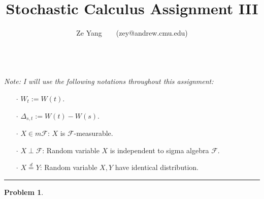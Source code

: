 \documentclass[a4paper, 10pt]{article}
\title{\textbf{Stochastic Calculus Assignment III}}
\author{Ze Yang~~~~(zey@andrew.cmu.edu)}
\theoremstyle{definition}
\newtheorem{problem}{Problem}
\theoremstyle{hSol}
\begin{document}
\maketitle

~\\
\textit{Note:} \textit{I will use the following notations throughout this assignment:}
\begin{itemize}
	\item[$\cdot$] $W_t := W(t)$.
	\item[$\cdot$] $\Delta_{s,t} := W(t) - W(s)$.
	\item[$\cdot$] $X\in m \mathcal{F}$: $X$ is $\mathcal{F}$-measurable.
	\item[$\cdot$] $X\perp \mathcal{F}$: Random variable $X$ is independent to sigma algebra $\mathcal{F}$. 
	\item[$\cdot$] $X\stackrel{d}{=} Y$: Random variable $X,Y$ have identical distribution.
\end{itemize}
\noindent\rule{16cm}{0.4pt}
\begin{problem}
\end{problem}
\end{document}
